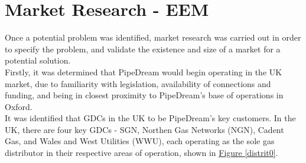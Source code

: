 \documentclass[11pt]{article}		%
\newcommand{\figref}[1]{\hyperref[#1]{Figure \ref*{#1}}}    %
\begin{document}
    \section{Market Research - EEM}
    
        Once a potential problem was identified, market research was carried out in order to specify the problem, and validate the existence and size of a market for a potential solution. 
        \\
        \hspace*{2ex}Firstly, it was determined that PipeDream would begin operating in the UK market, due to familiarity with legislation, availability of connections and funding, and being in closest proximity to PipeDream's base of operations in Oxford. 
        \\
        \hspace*{2ex}It was identified that GDCs in the UK to be PipeDream's key customers. In the UK, there are four key GDCs - SGN, Northen Gas Networks (NGN), Cadent Gas, and Wales and West Utilities (WWU), each operating as the sole gas distributor in their respective areas of operation, shown in \figref{distrit0}. 
\end{document}
